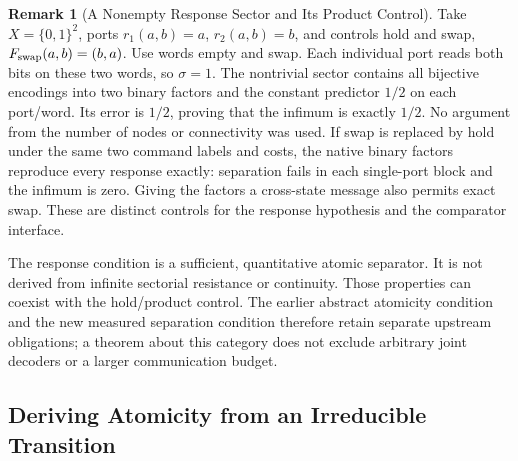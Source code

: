 \documentclass[11pt,a4paper]{article}
\theoremstyle{definition}
\newtheorem{remark}[theorem]{Remark}
\begin{document}
\begin{remark}[A Nonempty Response Sector and Its Product Control]
\label{ex:response-atomic-swap}
Take $X=\{0,1\}^2$, ports $r_1(a,b)=a$, $r_2(a,b)=b$, and controls hold
and swap, $F_{\rm swap}(a,b)=(b,a)$. Use words empty and swap. Each individual
port reads both bits on these two words, so $\sigma=1$. The nontrivial sector
contains all bijective encodings into two binary factors and the constant
predictor $1/2$ on each port/word. Its error is $1/2$, proving that the
infimum is exactly $1/2$. No argument from the number of nodes or connectivity
was used. If swap is replaced by hold under the same two command labels and
costs, the native binary factors reproduce every response exactly: separation
fails in each single-port block and the infimum is zero. Giving the factors
a cross-state message also permits exact swap. These are distinct controls
for the response hypothesis and the comparator interface.
\end{remark}

The response condition is a sufficient, quantitative atomic separator. It is
not derived from infinite sectorial resistance or continuity. Those properties
can coexist with the hold/product control. The earlier abstract atomicity
condition and the new measured separation condition therefore retain separate
upstream obligations; a theorem about this category does not exclude arbitrary
joint decoders or a larger communication budget.


\subsection{Deriving Atomicity from an Irreducible Transition}
\end{document}
